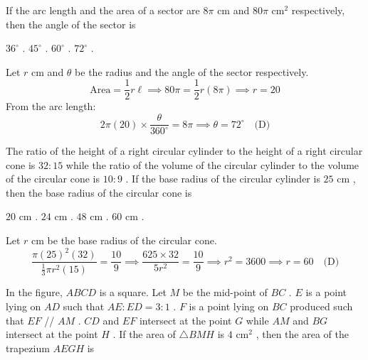 
\question If the arc length and the area of a sector are $8\pi\text{ cm}$ and $80\pi\text{ cm}^2$ respectively, then the angle of the sector is
\begin{choices}
    \choice $36^\circ$ .
    \choice $45^\circ$ .
    \choice $60^\circ$ .
    \correctchoice $72^\circ$ .
\end{choices}
\begin{solution}
Let $r\text{ cm}$ and $\theta$ be the radius and the angle of the sector respectively.
\[ \text{Area} = \frac{1}{2}r\ell \implies 80\pi = \frac{1}{2}r(8\pi) \implies r = 20 \]
From the arc length:
\[ 2\pi(20) \times \frac{\theta}{360^\circ} = 8\pi \implies \theta = 72^\circ \quad \text{(D)} \]
\end{solution}

\question The ratio of the height of a right circular cylinder to the height of a right circular cone is $32 : 15$ while the ratio of the volume of the circular cylinder to the volume of the circular cone is $10 : 9$ . If the base radius of the circular cylinder is $25\text{ cm}$ , then the base radius of the circular cone is
\begin{choices}
    \choice $20\text{ cm}$ .
    \choice $24\text{ cm}$ .
    \choice $48\text{ cm}$ .
    \correctchoice $60\text{ cm}$ .
\end{choices}
\begin{solution}
Let $r\text{ cm}$ be the base radius of the circular cone.
\[ \frac{\pi(25)^2(32)}{\frac{1}{3}\pi r^2(15)} = \frac{10}{9} \implies \frac{625 \times 32}{5r^2} = \frac{10}{9} \implies r^2 = 3600 \implies r = 60 \quad \text{(D)} \]
\end{solution}

\question In the figure, $ABCD$ is a square. Let $M$ be the mid-point of $BC$ . $E$ is a point lying on $AD$ such that $AE : ED = 3 : 1$ . $F$ is a point lying on $BC$ produced such that $EF$ // $AM$ . $CD$ and $EF$ intersect at the point $G$ while $AM$ and $BG$ intersect at the point $H$ . If the area of $\triangle BMH$ is $4\text{ cm}^2$ , then the area of the trapezium $AEGH$ is


